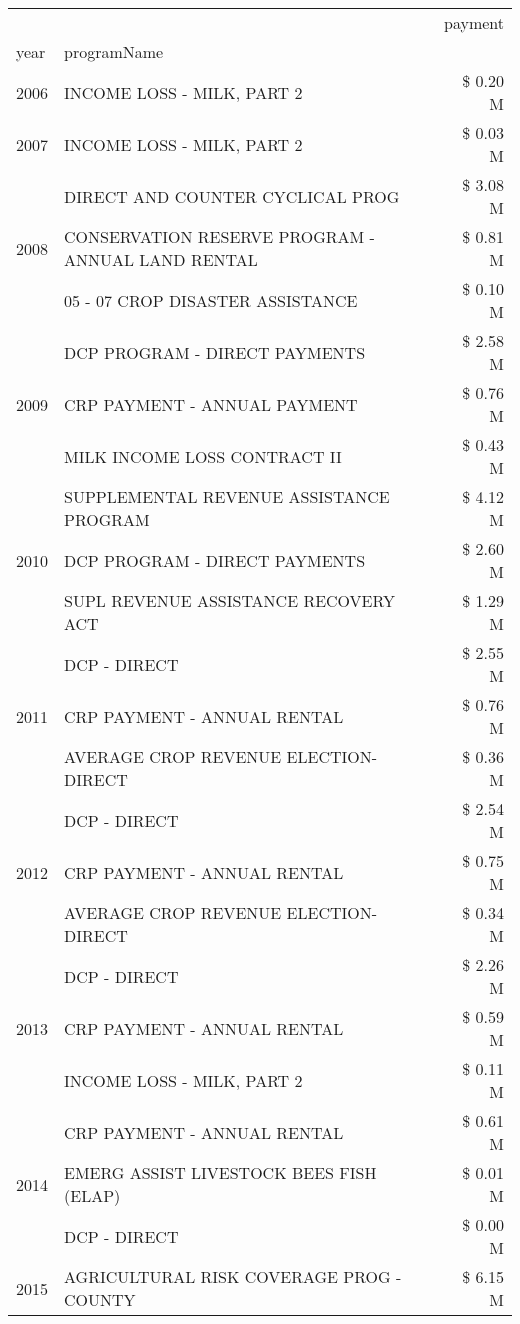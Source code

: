\begin{tabular}{llr}
\toprule
 &  & payment \\
year & programName &  \\
\midrule
2006 & INCOME LOSS - MILK, PART 2 & \$ 0.20 M \\
\cline{1-3}
2007 & INCOME LOSS - MILK, PART 2 & \$ 0.03 M \\
\cline{1-3}
\multirow[t]{3}{*}{2008} & DIRECT AND COUNTER CYCLICAL PROG & \$ 3.08 M \\
 & CONSERVATION RESERVE PROGRAM - ANNUAL LAND RENTAL & \$ 0.81 M \\
 & 05 - 07 CROP DISASTER ASSISTANCE & \$ 0.10 M \\
\cline{1-3}
\multirow[t]{3}{*}{2009} & DCP PROGRAM - DIRECT PAYMENTS & \$ 2.58 M \\
 & CRP PAYMENT - ANNUAL PAYMENT & \$ 0.76 M \\
 & MILK INCOME LOSS CONTRACT II & \$ 0.43 M \\
\cline{1-3}
\multirow[t]{3}{*}{2010} & SUPPLEMENTAL REVENUE ASSISTANCE PROGRAM & \$ 4.12 M \\
 & DCP PROGRAM - DIRECT PAYMENTS & \$ 2.60 M \\
 & SUPL REVENUE ASSISTANCE RECOVERY ACT & \$ 1.29 M \\
\cline{1-3}
\multirow[t]{3}{*}{2011} & DCP - DIRECT & \$ 2.55 M \\
 & CRP PAYMENT - ANNUAL RENTAL & \$ 0.76 M \\
 & AVERAGE CROP REVENUE ELECTION-DIRECT & \$ 0.36 M \\
\cline{1-3}
\multirow[t]{3}{*}{2012} & DCP - DIRECT & \$ 2.54 M \\
 & CRP PAYMENT - ANNUAL RENTAL & \$ 0.75 M \\
 & AVERAGE CROP REVENUE ELECTION-DIRECT & \$ 0.34 M \\
\cline{1-3}
\multirow[t]{3}{*}{2013} & DCP - DIRECT & \$ 2.26 M \\
 & CRP PAYMENT - ANNUAL RENTAL & \$ 0.59 M \\
 & INCOME LOSS - MILK, PART 2 & \$ 0.11 M \\
\cline{1-3}
\multirow[t]{3}{*}{2014} & CRP PAYMENT - ANNUAL RENTAL & \$ 0.61 M \\
 & EMERG ASSIST LIVESTOCK BEES FISH (ELAP) & \$ 0.01 M \\
 & DCP - DIRECT & \$ 0.00 M \\
\cline{1-3}
\multirow[t]{3}{*}{2015} & AGRICULTURAL RISK COVERAGE PROG - COUNTY & \$ 6.15 M \\

\end{tabular}
